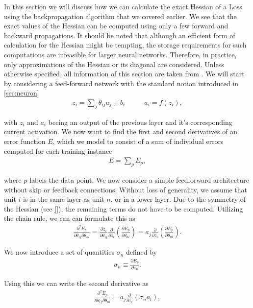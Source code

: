 In this section we will discuss how we can calculate the exact Hessian of a Loss using the backpropagation
algorithm that we covered earlier. We see that the exact values of the Hessian can be computed
using only a few forward and backward propagations. It should be noted that although an efficient 
form of calculation for the Hessian might be tempting, the storage requirements for such 
computations are infeasible for larger neural networks. Therefore, in practice, only approximations
of the Hessian or its diagonal are considered.
Unless otherwise specified, all information of this section are taken from \cite{Bishop1992}.
We will start by considering a feed-forward network with the standard notion introduced in \ref{sec:neuron}
\begin{align}                                                                                              
    z_i = \sum_j \theta_{ij} a_j + b_i  \quad &\quad
    a_i = f(z_i),
\end{align}

with $z_i$ and $a_i$ beeing an output of the previous layer and it's corresponding current activation.
We now want to find the first and second derivatives of an error function \(E\), which we model to consist of a sum of individual errors computed for each training instance
\begin{align}
E = \sum_p E_p,
\end{align}

where \(p\) labels the data point. We now consider a simple feedforward architecture without skip
or feedback connections. Without loss of generality, we assume that unit \(i\) is in the same layer
as unit \(n\), or in a lower layer. Due to the symmetry of the Hessian (see \ref{}), the remaining 
terms do not have to be computed. Utilizing the chain rule, we can can formulate this as
\begin{align}
\frac{\partial^2 E_p}{\partial \theta_{ij} \partial \theta_{nl}} = \frac{\partial z_i}{\partial \theta_{ij}} \frac{\partial}{\partial z_i} \left( \frac{\partial E_p}{\partial \theta_{nl}} \right) = a_j \frac{\partial}{\partial z_i} \left( \frac{\partial E_p}{\partial \theta_{nl}} \right).
\end{align}

We now introduce a set of quantities \(\sigma_n\) defined by
\begin{align}
\sigma_n \equiv \frac{\partial E_p}{\partial z_n}.
\end{align}

Using this we can write the second derivative as
\begin{align}
\frac{\partial^2 E_p}{\partial \theta_{ij} \partial \theta_{nl}} = a_j \frac{\partial}{\partial z_i} (\sigma_n a_l),
\end{align}

